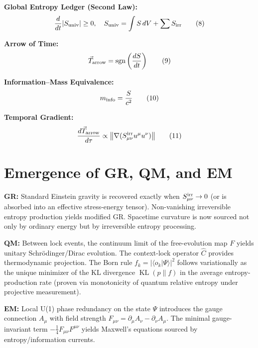 \documentclass[11pt,letterpaper]{article}
\begin{document}
\textbf{Global Entropy Ledger (Second Law):}
\begin{equation}
\frac{d}{dt} |S_{\rm univ}| \geq 0, \quad S_{\rm univ} = \int S \, dV + \sum S_{\rm irr} \tag{8}
\end{equation}

\textbf{Arrow of Time:}
\begin{equation}
\vec{T}_{\rm arrow} = \operatorname{sgn}\left( \frac{dS}{dt} \right) \tag{9}
\end{equation}

\textbf{Information--Mass Equivalence:}
\begin{equation}
m_{\rm info} = \frac{S}{c^2} \tag{10}
\end{equation}

\textbf{Temporal Gradient:}
\begin{equation}
\frac{d\vec{T}_{\rm arrow}}{d\tau} \propto \bigl\| \nabla (S_{\mu\nu}^{\rm irr} u^\mu u^\nu) \bigr\| \tag{11}
\end{equation}

\section{Emergence of GR, QM, and EM}

\textbf{GR:} Standard Einstein gravity is recovered exactly when \(S_{\mu\nu}^{\rm irr} \to 0\) (or is absorbed into an effective stress-energy tensor). Non-vanishing irreversible entropy production yields modified GR. Spacetime curvature is now sourced not only by ordinary energy but by irreversible entropy processing.

\textbf{QM:} Between lock events, the continuum limit of the free-evolution map \(F\) yields unitary Schrödinger/Dirac evolution. The context-lock operator \(\hat{C}\) provides thermodynamic projection. The Born rule \(f_k = |\langle o_k | \Psi \rangle|^2\) follows variationally as the unique minimizer of the KL divergence \(\operatorname{KL}(p \| f)\) in the average entropy-production rate (proven via monotonicity of quantum relative entropy under projective measurement).

\textbf{EM:} Local U(1) phase redundancy on the state \(\Psi\) introduces the gauge connection \(A_\mu\) with field strength \(F_{\mu\nu} = \partial_\mu A_\nu - \partial_\nu A_\mu\). The minimal gauge-invariant term \(-\frac{1}{4} F_{\mu\nu} F^{\mu\nu}\) yields Maxwell’s equations sourced by entropy/information currents.
\end{document}

